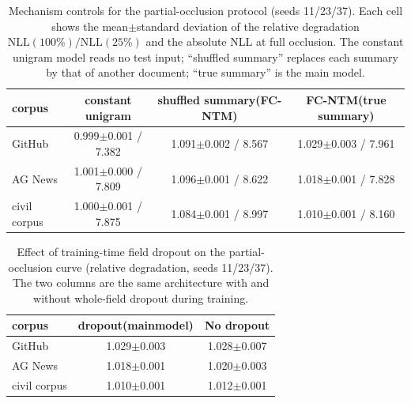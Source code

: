 \documentclass[11pt]{article}
\newcommand{\fcntm}{FC-NTM}
\begin{document}
\begin{table}[t]
\centering
\caption{Mechanism controls for the partial-occlusion protocol (seeds 11/23/37). Each cell shows the mean$\pm$standard deviation of the relative degradation $\mathrm{NLL}(100\%)/\mathrm{NLL}(25\%)$ and the absolute NLL at full occlusion. The constant unigram model reads no test input; ``shuffled summary'' replaces each summary by that of another document; ``true summary'' is the main model.}
\label{tab:occl-controls}
\small
\setlength{\tabcolsep}{4pt}
\begin{tabular}{@{}lccc@{}}
\toprule
corpus & constant unigram & shuffled summary(\fcntm{}) & \fcntm{}(true summary) \\
\midrule
GitHub & 0.999$\pm$0.001 / 7.382 & 1.091$\pm$0.002 / 8.567 & 1.029$\pm$0.003 / 7.961 \\
AG News & 1.001$\pm$0.000 / 7.809 & 1.096$\pm$0.001 / 8.622 & 1.018$\pm$0.001 / 7.828 \\
civil corpus & 1.000$\pm$0.001 / 7.875 & 1.084$\pm$0.001 / 8.997 & 1.010$\pm$0.001 / 8.160 \\
\bottomrule
\end{tabular}
\end{table}

\begin{table}[t]
\centering
\caption{Effect of training-time field dropout on the partial-occlusion curve (relative degradation, seeds 11/23/37). The two columns are the same architecture with and without whole-field dropout during training.}
\label{tab:fielddrop-control}
\small
\setlength{\tabcolsep}{4pt}
\begin{tabular}{@{}lcc@{}}
\toprule
corpus & dropout(mainmodel) & No dropout \\
\midrule
GitHub & 1.029$\pm$0.003 & 1.028$\pm$0.007 \\
AG News & 1.018$\pm$0.001 & 1.020$\pm$0.003 \\
civil corpus & 1.010$\pm$0.001 & 1.012$\pm$0.001 \\
\bottomrule
\end{tabular}
\end{table}
\end{document}
